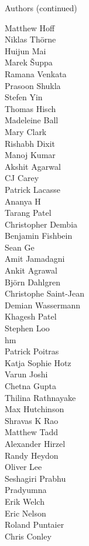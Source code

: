 \begin{frame}{Authors (continued)}
\begin{multicols}{5}
\tiny
Matthew Hoff\\
Niklas Thörne\\
Huijun Mai\\
Marek Šuppa\\
Ramana Venkata\\
Prasoon Shukla\\
Stefen Yin\\
Thomas Hisch\\
Madeleine Ball\\
Mary Clark\\
Rishabh Dixit\\
Manoj Kumar\\
Akshit Agarwal\\
CJ Carey\\
Patrick Lacasse\\
Ananya H\\
Tarang Patel\\
Christopher Dembia\\
Benjamin Fishbein\\
Sean Ge\\
Amit Jamadagni\\
Ankit Agrawal\\
Björn Dahlgren\\
Christophe Saint-Jean\\
Demian Wassermann\\
Khagesh Patel\\
Stephen Loo\\
hm\\
Patrick Poitras\\
Katja Sophie Hotz\\
Varun Joshi\\
Chetna Gupta\\
Thilina Rathnayake\\
Max Hutchinson\\
Shravas K Rao\\
Matthew Tadd\\
Alexander Hirzel\\
Randy Heydon\\
Oliver Lee\\
Seshagiri Prabhu\\
Pradyumna\\
Erik Welch\\
Eric Nelson\\
Roland Puntaier\\
Chris Conley\\

\end{multicols}
\end{frame}
